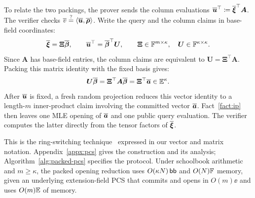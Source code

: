 To relate the two packings, the prover sends the column evaluations
\(\overline{\bm u}^{\top}\coloneqq\overline{\bm\xi}^{\top}\bm A\).
The verifier checks
\(\overline{v}\mathrel{\overset{\mathrm{?}}{=}}\langle\overline{\bm u},\overline{\bm\rho}\rangle\).
Write the query and the column claims in base-field coordinates:
\[
    \overline{\bm\xi}=\bm\Xi\overline{\bm\beta},
    \qquad
    \overline{\bm u}^{\top}=\overline{\bm\beta}^{\top}\bm U,
    \qquad
    \bm\Xi\in{\mathbb{F}}^{m\times\kappa},
    \quad
    \bm U\in{\mathbb{F}}^{\kappa\times\kappa}.
\]
Since \(\bm A\) has base-field entries, the column claims are
equivalent to \(\bm U=\bm\Xi^\top\bm A\).
Packing this matrix identity with the fixed basis gives:
\[
    \bm U\overline{\bm\beta}
    =\bm\Xi^\top\bm A\overline{\bm\beta}
    =\bm\Xi^\top\overline{\bm a}\in\mathbb{E}^\kappa.
\]
After \(\overline{\bm u}\) is fixed, a fresh random projection reduces
this vector identity to a length-\(m\) inner-product claim involving
the committed vector \(\overline{\bm a}\).
Fact~\ref{fact:ip} then leaves one MLE opening of
\(\overline{\bm a}\) and one public query evaluation.
The verifier computes the latter directly from the tensor factors
of \(\overline{\bm\xi}\).

This is the ring-switching technique~\cite{eurocrypt/DiamondP26}
expressed in our vector and matrix notation.
Appendix~\ref{appx:pcs} gives the construction and its analysis;
Algorithm~\ref{alg:packed-pcs} specifies the protocol.
Under schoolbook arithmetic and \(m\geq\kappa\), the packed
opening reduction uses \(O(\kappa N)\,\mathsf{bb}\) and
\(O(N){\mathbb{F}}\) memory,
given an underlying extension-field PCS that commits and opens in \(O(m)\ee\) and uses \(O(m)\mathbb{E}\) of memory.
